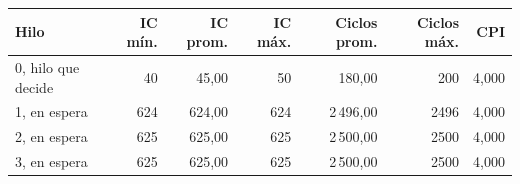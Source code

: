 \begin{tabular}{lrrrrrr}
\toprule
Hilo & IC mín. & IC prom. & IC máx. & Ciclos prom. & Ciclos máx. & CPI \\
\midrule
0, hilo que decide & 40 & 45{,}00 & 50 & 180{,}00 & 200 & 4{,}000 \\
1, en espera & 624 & 624{,}00 & 624 & 2\,496{,}00 & 2496 & 4{,}000 \\
2, en espera & 625 & 625{,}00 & 625 & 2\,500{,}00 & 2500 & 4{,}000 \\
3, en espera & 625 & 625{,}00 & 625 & 2\,500{,}00 & 2500 & 4{,}000 \\
\bottomrule
\end{tabular}
\par{}
